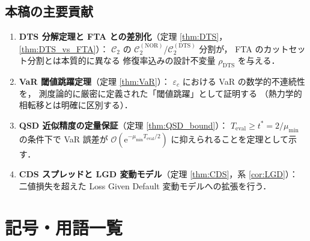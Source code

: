 \documentclass[12pt,a4paper]{article}
\theoremstyle{plain}
\theoremstyle{definition}
\theoremstyle{remark}
\newcommand{\calO}{\mathcal{O}}
\newcommand{\eps}{\varepsilon}
\newcommand{\e}{\mathrm{e}}
\newcommand{\calCtwo}{\mathcal{C}_2}
\newcommand{\calCNOR}{\calCtwo^{(\mathrm{NOR})}}
\newcommand{\calCDTS}{\calCtwo^{(\mathrm{DTS})}}
\newcommand{\rhoDTS}{\rho_{\mathrm{DTS}}}
\newcommand{\Teval}{T_{\mathrm{eval}}}
\begin{document}
\subsection{本稿の主要貢献}

\begin{enumerate}
  \item \textbf{DTS 分解定理と FTA との差別化}（定理 \ref{thm:DTS}，\ref{thm:DTS_vs_FTA}）：
    $\calCtwo$ の $\calCNOR$/$\calCDTS$ 分割が，
    FTA のカットセット分割とは本質的に異なる
    修復率込みの設計不変量 $\rhoDTS$ を与える．

  \item \textbf{VaR 閾値跳躍定理}（定理 \ref{thm:VaR}）：
    $\eps_c$ における VaR の数学的不連続性を，
    測度論的に厳密に定義された「閾値跳躍」として証明する
    （熱力学的相転移とは明確に区別する）．

  \item \textbf{QSD 近似精度の定量保証}（定理 \ref{thm:QSD_bound}）：
    $\Teval \ge t^* = 2/\mu_{\min}$ の条件下で VaR 誤差が
    $\calO(\e^{-\mu_{\min}\Teval/2})$ に抑えられることを定理として示す．

  \item \textbf{CDS スプレッドと LGD 変動モデル}（定理 \ref{thm:CDS}，系 \ref{cor:LGD}）：
    二値損失を超えた Loss Given Default 変動モデルへの拡張を行う．
\end{enumerate}

\section{記号・用語一覧}\label{sec:notation}
\end{document}
